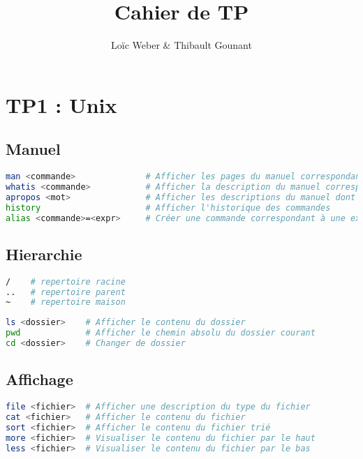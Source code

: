 \documentclass{article}
\author{Loïc Weber \& Thibault Gounant}
\title{Cahier de TP}
\begin{document}
\setlength\parindent{0pt}

\maketitle

\renewcommand*\contentsname{Table des matières}
\tableofcontents

\section{TP1 : Unix}

\subsection{Manuel}
\begin{lstlisting}[language=bash]
man <commande>              # Afficher les pages du manuel correspondant à la commande
whatis <commande>           # Afficher la description du manuel correspondant à la commande
apropos <mot>               # Afficher les descriptions du manuel dont les pages contiennent le mot 
history                     # Afficher l'historique des commandes
alias <commande>=<expr>     # Créer une commande correspondant à une expression
\end{lstlisting}

\subsection{Hierarchie}
\begin{lstlisting}[language=bash]
/    # repertoire racine
..   # repertoire parent
~    # repertoire maison
\end{lstlisting}

\begin{lstlisting}[language=bash]
ls <dossier>    # Afficher le contenu du dossier
pwd             # Afficher le chemin absolu du dossier courant
cd <dossier>    # Changer de dossier
\end{lstlisting}

\subsection{Affichage}
\begin{lstlisting}[language=bash]
file <fichier>  # Afficher une description du type du fichier
cat <fichier>   # Afficher le contenu du fichier
sort <fichier>  # Afficher le contenu du fichier trié
more <fichier>  # Visualiser le contenu du fichier par le haut
less <fichier>  # Visualiser le contenu du fichier par le bas
\end{lstlisting}
\end{document}
